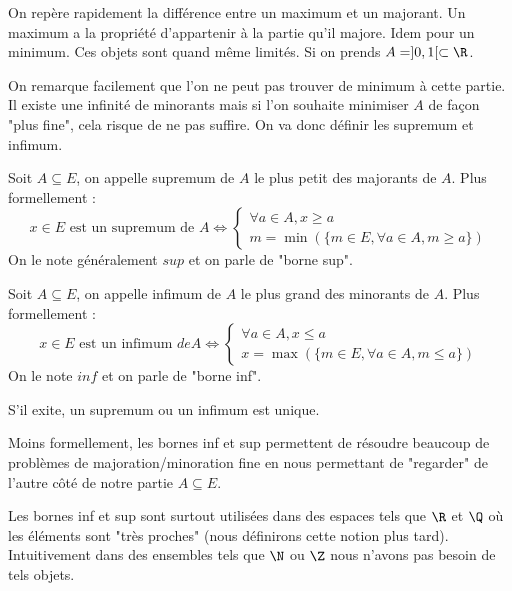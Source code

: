 \begin{remark}
    On repère rapidement la différence entre un maximum et un majorant. Un maximum a la propriété d'appartenir à la partie qu'il majore. 
    Idem pour un minimum. Ces objets sont quand même limités. Si on prends $A = ]0,1[ \subset \R$. 
    
    On remarque facilement 
    que l'on ne peut pas trouver de minimum à cette partie. Il existe une infinité de minorants mais si l'on souhaite minimiser 
    $A$ de façon "plus fine", cela risque de ne pas suffire. On va donc définir les supremum et infimum. 
\end{remark}

\begin{definition}[Supremum]
    Soit $A \subseteq E$, on appelle supremum de $A$ le plus petit des majorants de $A$. 
    Plus formellement :
        \[ x \in E \text{ est un supremum de } A \iff 
            \begin{cases}
                \forall a \in A, x \geqslant a \\
                m = \min(\{m \in E, \forall a \in A, m \geqslant a\})
            \end{cases}
        \]
    On le note généralement $sup$ et on parle de "borne sup". 
\end{definition}

\begin{definition}[Infimum]
    Soit $A \subseteq E$, on appelle infimum de $A$ le plus grand des minorants de $A$. 
    Plus formellement :
        \[ x \in E \text{ est un infimum } de A \iff 
            \begin{cases}
                \forall a \in A, x \leqslant a \\
                x = \max(\{m \in E, \forall a \in A, m \leqslant a\})
            \end{cases}
        \] 
    On le note $inf$ et on parle de "borne inf". 
\end{definition}

\begin{proposition}
    S'il exite, un supremum ou un infimum est unique. 
\end{proposition}

\begin{remark}
    Moins formellement, les bornes inf et sup permettent de résoudre beaucoup de problèmes de majoration/minoration
    fine en nous permettant de "regarder" de l'autre côté de notre partie $A \subseteq E$. 

    Les bornes inf et sup sont surtout utilisées dans des espaces tels que $\R$ et $\Q$ où les éléments sont "très proches"
    (nous définirons cette notion plus tard). Intuitivement dans des ensembles tels que $\N$ ou $\Z$ nous n'avons pas besoin 
    de tels objets. 
\end{remark}

